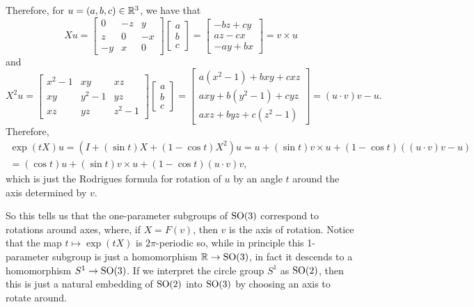 \begin{example}
	Therefore, for $u = (a,b,c) \in \mathbb{R}^3$, we have that
	\[
		Xu = \begin{bmatrix} 0 & -z & y \\ z & 0 & -x \\ -y & x & 0 \end{bmatrix} \begin{bmatrix} a \\ b \\ c \end{bmatrix} = \begin{bmatrix} -bz + cy \\ az-cx \\ -ay+bx \end{bmatrix} = v \times u
	\]
	and
	\[
		X^2 u = \begin{bmatrix} x^2-1 & x y & x z \\ x y & y^2-1 & y z \\ x z & y z & z^2-1\end{bmatrix} \begin{bmatrix} a \\ b \\ c \end{bmatrix} = \begin{bmatrix} a(x^2-1) + bxy + cxz \\ axy + b(y^2-1) + cyz \\ axz + byz + c(z^2-1) \end{bmatrix} = (u \cdot v)v - u.
	\]
	Therefore,
	\begin{multline*}
		\exp(tX)u = (I + (\sin t) X + (1-\cos t)X^2)u = u + (\sin t) v\times u + (1-\cos t)((u\cdot v) v - u) \\
		= (\cos t) u + (\sin t) v \times u + (1-\cos t) (u \cdot v) v,
	\end{multline*}
	which is just the Rodrigues formula for rotation of $u$ by an angle $t$ around the axis determined by $v$.
	
	So this tells us that the one-parameter subgroups of $\operatorname{SO}(3)$ correspond to rotations around axes, where, if $X = F(v)$, then $v$ is the axis of rotation. Notice that the map $t \mapsto \exp(tX)$ is $2\pi$-periodic so, while in principle this 1-parameter subgroup is just a homomorphism $\mathbb{R} \to \operatorname{SO}(3)$, in fact it descends to a homomorphism $S^1 \to \operatorname{SO}(3)$. If we interpret the circle group $S^1$ as $\operatorname{SO}(2)$, then this is just a natural embedding of $\operatorname{SO}(2)$ into $\operatorname{SO}(3)$ by choosing an axis to rotate around.
\end{example}

